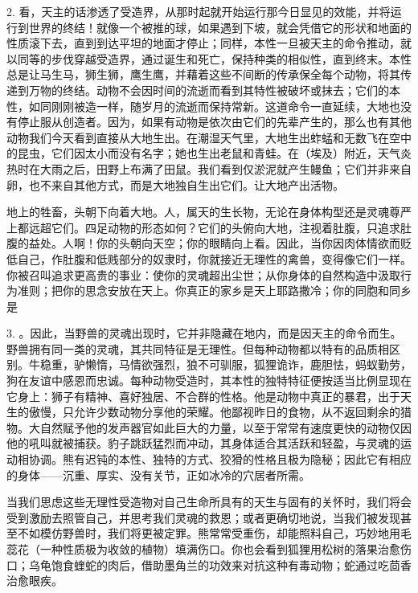 2. 看，天主的话渗透了受造界，从那时起就开始运行那今日显见的效能，并将运行到世界的终结！就像一个被推的球，如果遇到下坡，就会凭借它的形状和地面的性质滚下去，直到到达平坦的地面才停止；同样，本性一旦被天主的命令推动，就以同等的步伐穿越受造界，通过诞生和死亡，保持种类的相似性，直到终末。本性总是让马生马，狮生狮，鹰生鹰，并藉着这些不间断的传承保全每个动物，将其传递到万物的终结。动物不会因时间的流逝而看到其特性被破坏或抹去；它们的本性，如同刚刚被造一样，随岁月的流逝而保持常新。这道命令一直延续，大地也没有停止服从创造者。因为，如果有动物是依次由它们的先辈产生的，那么也有其他动物我们今天看到直接从大地生出。在潮湿天气里，大地生出蚱蜢和无数飞在空中的昆虫，它们因太小而没有名字；她也生出老鼠和青蛙。在（埃及）附近，天气炎热时在大雨之后，田野上布满了田鼠。我们看到仅淤泥就产生鳗鱼；它们并非来自卵，也不来自其他方式，而是大地独自生出它们。让大地产出活物。\par

地上的牲畜，头朝下向着大地。人，属天的生长物，无论在身体构型还是灵魂尊严上都远超它们。四足动物的形态如何？它们的头俯向大地，注视着肚腹，只追求肚腹的益处。人啊！你的头朝向天空；你的眼睛向上看。因此，当你因肉体情欲而贬低自己，作肚腹和低贱部分的奴隶时，你就接近无理性的禽兽，变得像它们一样。你被召叫追求更高贵的事业：使你的灵魂超出尘世；从你身体的自然构造中汲取行为准则；把你的思念安放在天上。你真正的家乡是天上耶路撒冷；你的同胞和同乡是\par

3. 。因此，当野兽的灵魂出现时，它并非隐藏在地内，而是因天主的命令而生。野兽拥有同一类的灵魂，其共同特征是无理性。但每种动物都以特有的品质相区别。牛稳重，驴懒惰，马情欲强烈，狼不可驯服，狐狸诡诈，鹿胆怯，蚂蚁勤劳，狗在友谊中感恩而忠诚。每种动物受造时，其本性的独特特征便按适当比例显现在它身上：狮子有精神、喜好独居、不合群的性格。他是动物中真正的暴君，出于天生的傲慢，只允许少数动物分享他的荣耀。他鄙视昨日的食物，从不返回剩余的猎物。大自然赋予他的发声器官如此巨大的力量，以至于常常有速度更快的动物仅因他的吼叫就被捕获。豹子跳跃猛烈而冲动，其身体适合其活跃和轻盈，与灵魂的运动相协调。熊有迟钝的本性、独特的方式、狡猾的性格且极为隐秘；因此它有相应的身体——沉重、厚实、没有关节，正如冰冷的穴居者所需。\par

当我们思虑这些无理性受造物对自己生命所具有的天生与固有的关怀时，我们将会受到激励去照管自己，并思考我们灵魂的救恩；或者更确切地说，当我们被发现甚至不如模仿野兽时，我们将更被定罪。熊常常受重伤，却能照料自己，巧妙地用毛蕊花（一种性质极为收敛的植物）填满伤口。你也会看到狐狸用松树的落果治愈伤口；乌龟饱食蝰蛇的肉后，借助墨角兰的功效来对抗这种有毒动物；蛇通过吃茴香治愈眼疾。\par

